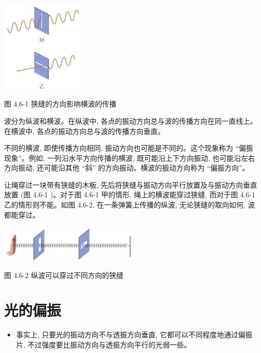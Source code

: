 \documentclass[10pt]{article}
\begin{document}
\begin{center}
\includegraphics[max width=0.3\textwidth]{images/01910e4c-ebb8-7d2c-8f2f-2375bc1d2d12_113_959154.jpg}
\end{center}

图 4.6-1 狭缝的方向影响横波的传播

波分为纵波和横波。在纵波中, 各点的振动方向总与波的传播方向在同一直线上。在横波中, 各点的振动方向总与波的传播方向垂直。

不同的横波, 即使传播方向相同, 振动方向也可能是不同的。这个现象称为 “偏振现象”。例如, 一列沿水平方向传播的横波, 既可能沿上下方向振动, 也可能沿左右方向振动, 还可能沿其他 “斜” 的方向振动。横波的振动方向称为 “偏振方向”。

让绳穿过一块带有狭缝的木板, 先后将狭缝与振动方向平行放置及与振动方向垂直放置 (图 4.6-1 )。对于图 4.6-1 甲的情形, 绳上的横波能穿过狭缝, 而对于图 4.6-1 乙的情形则不能。如图 4.6-2, 在一条弹簧上传播的纵波, 无论狭缝的取向如何, 波都能穿过。

\begin{center}
\includegraphics[max width=0.5\textwidth]{images/01910e4c-ebb8-7d2c-8f2f-2375bc1d2d12_113_725289.jpg}
\end{center}

图 4.6-2 纵波可以穿过不同方向的狭缝

\section*{光的偏振}

\begin{mdframed}

\begin{itemize}
\item 事实上, 只要光的振动方向不与透振方向垂直, 它都可以不同程度地通过偏振片, 不过强度要比振动方向与透振方向平行的光弱一些。
\end{itemize}

\end{mdframed}
\end{document}
